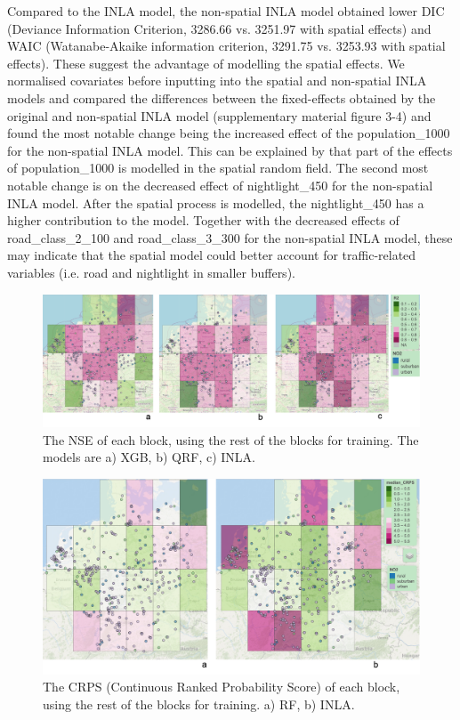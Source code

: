 \documentclass{article}
\begin{document}
Compared to the INLA model, the non-spatial INLA model obtained lower DIC (Deviance Information Criterion, 3286.66 vs. 3251.97 with spatial effects) and WAIC (Watanabe-Akaike information criterion, 3291.75 vs. 3253.93 with spatial effects). These suggest the advantage of modelling the spatial effects. We normalised covariates before inputting into the spatial and non-spatial INLA models and compared the differences between the fixed-effects obtained by the original and non-spatial INLA model (supplementary material figure 3-4) and found the most notable change being the increased effect of the population\_1000 for the non-spatial INLA model. This can be explained by that part of the effects of population\_1000 is modelled in the spatial random field. The second most notable change is on the decreased effect of nightlight\_450 for the non-spatial INLA model. After the spatial process is modelled, the nightlight\_450 has a higher contribution to the model. Together with the decreased effects of road\_class\_2\_100 and road\_class\_3\_300 for the non-spatial INLA model, these may indicate that the spatial model could better account for traffic-related variables (i.e. road and nightlight in smaller buffers).




\begin{figure}
    \centering
    \includegraphics[scale=0.4]{fig/r2spcv.png}
    \caption{The NSE of each block, using the rest of the blocks for training. The models are a) XGB, b) QRF, c) INLA. 
}
    \label{fig:r2}
\end{figure}

\begin{figure}
    \centering
    \includegraphics[scale=0.3]{fig/crps_RF_INLA.png}
    \caption{The CRPS (Continuous Ranked Probability Score) of each block, using the rest of the blocks for training. a) RF, b) INLA. 
}
    \label{fig:crps}
\end{figure}
\end{document}
